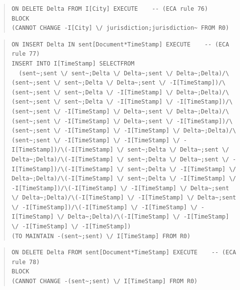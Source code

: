 \documentclass[10pt,a4paper]{report}              %
\theoremstyle{plain}\theorembodyfont{\rmfamily}\newtheorem{definition}{Definition}[section]
\theoremstyle{plain}\theorembodyfont{\rmfamily}\newtheorem{designrule}[definition]{Requirement}
\begin{document}
\begin{quote}
\begin{verbatim}
ON DELETE Delta FROM I[City] EXECUTE    -- (ECA rule 76)
BLOCK
(CANNOT CHANGE -I[City] \/ jurisdiction;jurisdiction~ FROM R0)
\end{verbatim}
\end{quote}
\begin{quote}
\begin{verbatim}
ON INSERT Delta IN sent[Document*TimeStamp] EXECUTE    -- (ECA rule 77)
INSERT INTO I[TimeStamp] SELECTFROM
  (sent~;sent \/ sent~;Delta \/ Delta~;sent \/ Delta~;Delta)/\(sent~;sent \/ sent~;Delta \/ Delta~;sent \/ -I[TimeStamp])/\(sent~;sent \/ sent~;Delta \/ -I[TimeStamp] \/ Delta~;Delta)/\(sent~;sent \/ sent~;Delta \/ -I[TimeStamp] \/ -I[TimeStamp])/\(sent~;sent \/ -I[TimeStamp] \/ Delta~;sent \/ Delta~;Delta)/\(sent~;sent \/ -I[TimeStamp] \/ Delta~;sent \/ -I[TimeStamp])/\(sent~;sent \/ -I[TimeStamp] \/ -I[TimeStamp] \/ Delta~;Delta)/\(sent~;sent \/ -I[TimeStamp] \/ -I[TimeStamp] \/ -I[TimeStamp])/\(-I[TimeStamp] \/ sent~;Delta \/ Delta~;sent \/ Delta~;Delta)/\(-I[TimeStamp] \/ sent~;Delta \/ Delta~;sent \/ -I[TimeStamp])/\(-I[TimeStamp] \/ sent~;Delta \/ -I[TimeStamp] \/ Delta~;Delta)/\(-I[TimeStamp] \/ sent~;Delta \/ -I[TimeStamp] \/ -I[TimeStamp])/\(-I[TimeStamp] \/ -I[TimeStamp] \/ Delta~;sent \/ Delta~;Delta)/\(-I[TimeStamp] \/ -I[TimeStamp] \/ Delta~;sent \/ -I[TimeStamp])/\(-I[TimeStamp] \/ -I[TimeStamp] \/ -I[TimeStamp] \/ Delta~;Delta)/\(-I[TimeStamp] \/ -I[TimeStamp] \/ -I[TimeStamp] \/ -I[TimeStamp])
(TO MAINTAIN -(sent~;sent) \/ I[TimeStamp] FROM R0)
\end{verbatim}
\end{quote}
\begin{quote}
\begin{verbatim}
ON DELETE Delta FROM sent[Document*TimeStamp] EXECUTE    -- (ECA rule 78)
BLOCK
(CANNOT CHANGE -(sent~;sent) \/ I[TimeStamp] FROM R0)
\end{verbatim}
\end{quote}
\end{document}
